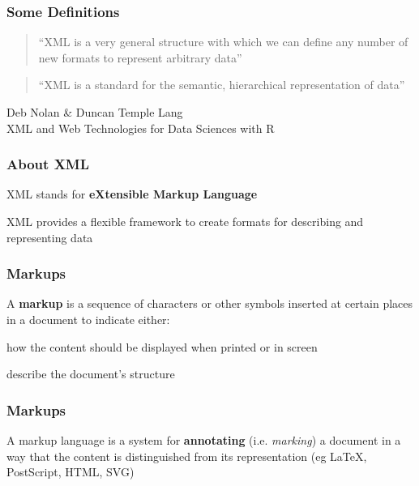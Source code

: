 \documentclass[12pt]{beamer}\usepackage[]{graphicx}\usepackage[]{color}
\begin{document}
\begin{frame}
\frametitle{Some Definitions}

\begin{quotation}
``XML is a very general structure with which we can define any number of new formats to represent arbitrary data''
\end{quotation}

\begin{quotation}
``XML is a standard for the semantic, hierarchical representation of data''
\end{quotation}

{\footnotesize 
\hspace{8mm} {\hilit Deb Nolan \& Duncan Temple Lang} \\
\hspace{8mm} {\lolit XML and Web Technologies for Data Sciences with R}
}

\end{frame}


\begin{frame}
\frametitle{About XML}

XML stands for \textbf{eXtensible Markup Language}
\eb

XML provides a flexible framework to create formats for describing and representing data
\eb

\end{frame}


\begin{frame}
\frametitle{Markups}

A \textbf{markup} is a sequence of characters or other symbols inserted at certain places in a document to indicate either: 
\bi
 \item how the content should be displayed when printed or in screen
 \item describe the document's structure
\ei
\eb

\end{frame}


\begin{frame}
\frametitle{Markups}

A markup language is a system for \textbf{annotating} (i.e. \textit{marking}) a document in a way that the content is distinguished from its representation (eg LaTeX, PostScript, HTML, SVG)
\eb

\end{frame}
\end{document}
